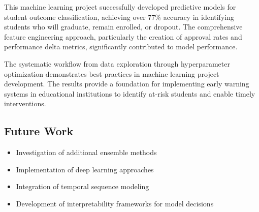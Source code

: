 \documentclass[twoside,final]{hcmut-report}
\begin{document}
This machine learning project successfully developed predictive models for student outcome classification, achieving over 77\% accuracy in identifying students who will graduate, remain enrolled, or dropout. The comprehensive feature engineering approach, particularly the creation of approval rates and performance delta metrics, significantly contributed to model performance.

The systematic workflow from data exploration through hyperparameter optimization demonstrates best practices in machine learning project development. The results provide a foundation for implementing early warning systems in educational institutions to identify at-risk students and enable timely interventions.

\subsection{Future Work}

\begin{itemize}
  \item Investigation of additional ensemble methods
  \item Implementation of deep learning approaches
  \item Integration of temporal sequence modeling
  \item Development of interpretability frameworks for model decisions
\end{itemize}
\end{document}
